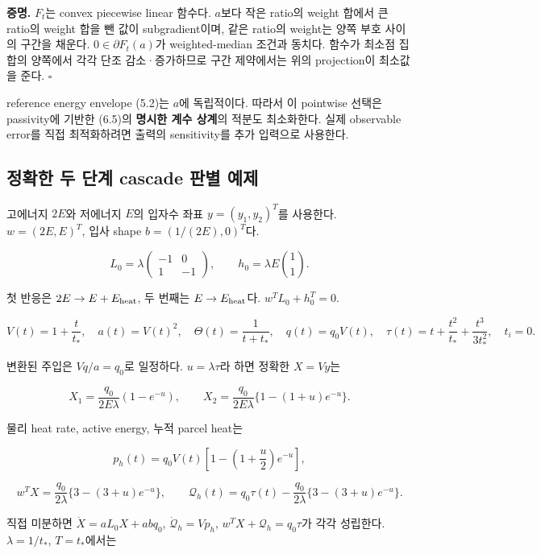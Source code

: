 \textbf{증명.} \(F_t\)는 convex piecewise linear 함수다. \(a\)보다 작은 ratio의 weight 합에서 큰 ratio의 weight 합을 뺀 값이 subgradient이며, 같은 ratio의 weight는 양쪽 부호 사이의 구간을 채운다. \(0\in\partial F_t(a)\)가 weighted-median 조건과 동치다. 함수가 최소점 집합의 양쪽에서 각각 단조 감소·증가하므로 구간 제약에서는 위의 projection이 최소값을 준다. \(\square\)

reference energy envelope (5.2)는 \(a\)에 독립적이다. 따라서 이 pointwise 선택은 passivity에 기반한 (6.5)의 \textbf{명시한 계수 상계}의 적분도 최소화한다. 실제 observable error를 직접 최적화하려면 출력의 sensitivity를 추가 입력으로 사용한다.

\hypertarget{uxc815uxd655uxd55c-uxb450-uxb2e8uxacc4-cascade-uxd310uxbcc4-uxc608uxc81c}{%
\subsection{정확한 두 단계 cascade 판별 예제}\label{uxc815uxd655uxd55c-uxb450-uxb2e8uxacc4-cascade-uxd310uxbcc4-uxc608uxc81c}}

고에너지 \(2E\)와 저에너지 \(E\)의 입자수 좌표 \(y=(y_1,y_2)^T\)를 사용한다. \(w=(2E,E)^T\), 입사 shape \(b=(1/(2E),0)^T\)다.

\[
L_0=\lambda
\begin{pmatrix}-1&0\\1&-1\end{pmatrix},
\qquad
h_0=\lambda E\binom11.
\tag{8.1}
\]

첫 반응은 \(2E\to E+E_{\rm heat}\), 두 번째는 \(E\to E_{\rm heat}\)다. \(w^TL_0+h_0^T=0\).

\[
V(t)=1+\frac{t}{t_*},\quad a(t)=V(t)^2,\quad
\Theta(t)=\frac1{t+t_*},\quad
q(t)=q_0V(t),\quad
\tau(t)=t+\frac{t^2}{t_*}+\frac{t^3}{3t_*^2},\quad t_i=0.
\tag{8.2}
\]

변환된 주입은 \(Vq/a=q_0\)로 일정하다. \(u=\lambda\tau\)라 하면 정확한 \(X=Vy\)는

\[
X_1=\frac{q_0}{2E\lambda}(1-e^{-u}),\qquad
X_2=\frac{q_0}{2E\lambda}\{1-(1+u)e^{-u}\}.
\tag{8.3}
\]

물리 heat rate, active energy, 누적 parcel heat는

\[
\boxed{
p_h(t)=q_0V(t)\left[1-\left(1+\frac u2\right)e^{-u}\right],
}
\tag{8.4}
\]

\[
w^TX=
\frac{q_0}{2\lambda}\{3-(3+u)e^{-u}\},
\qquad
\boxed{
\mathcal Q_h(t)
=q_0\tau(t)-\frac{q_0}{2\lambda}\{3-(3+u)e^{-u}\}.
}
\tag{8.5}
\]

직접 미분하면 \(\dot X=aL_0X+abq_0\), \(\dot{\mathcal Q}_h=Vp_h\), \(w^TX+\mathcal Q_h=q_0\tau\)가 각각 성립한다. \(\lambda=1/t_*\), \(T=t_*\)에서는

